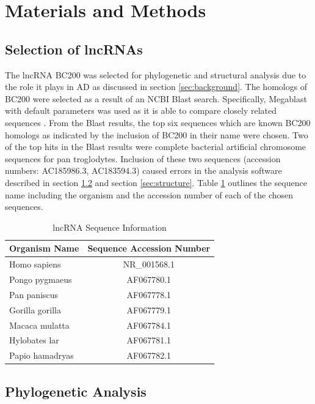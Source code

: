 \documentclass[conference]{IEEEtran}
\begin{document}
\section{Materials and Methods}\label{sec:methods}

\subsection{Selection of lncRNAs}\label{sec:lncRNA-selection}
The lncRNA BC200 was selected for phylogenetic and structural analysis due to the role it plays in AD as discussed in section \ref{sec:background}. 
The homologs of BC200 were selected as a result of an NCBI Blast \cite{blastTool} search. 
Specifically, Megablast \cite{morgulis2008database} with default parameters was used as it is able to compare closely related sequences \cite{amirmahani2018phylogenetic}. 
From the Blast results, the top six sequences which are known BC200 homologs as indicated by the inclusion of BC200 in their name were chosen. 
Two of the top hits in the Blast results were complete bacterial artificial chromosome sequences for pan troglodytes. 
Inclusion of these two sequences (accession numbers: AC185986.3, AC183594.3) caused errors in the analysis software described in section \ref{sec:phylo} and section \ref{sec:structure}. 
Table \ref{tbl:accession} outlines the sequence name including the organism and the accession number of each of the chosen sequences. 

\begin{table}[h]
  \centering
  \caption{lncRNA Sequence Information}
  \label{tbl:accession}
  \begin{tabular}{lc}
    \toprule
    Organism Name & Sequence Accession Number \\
    \midrule
    Homo sapiens    & NR\_001568.1 \\
    Pongo pygmaeus  & AF067780.1 \\
    Pan paniscus    & AF067778.1 \\
    Gorilla gorilla & AF067779.1 \\
    Macaca mulatta  & AF067784.1 \\
    Hylobates lar   & AF067781.1 \\
    Papio hamadryas & AF067782.1 \\
    \bottomrule
  \end{tabular}
\end{table}

\subsection{Phylogenetic Analysis}\label{sec:phylo}
\end{document}
